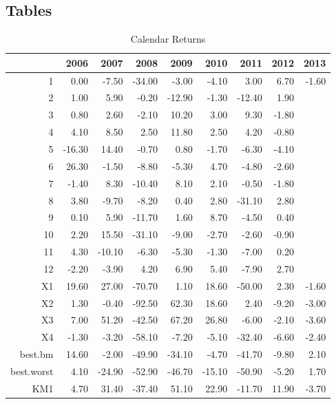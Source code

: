 \documentclass{article}
\begin{document}
\subsection{Tables}
\begin{table}[ht]
\begin{center}
\caption{Calendar Returns}
\begin{tabular}{rrrrrrrrr}
  \hline
 & 2006 & 2007 & 2008 & 2009 & 2010 & 2011 & 2012 & 2013 \\ 
  \hline
1 & 0.00 & -7.50 & -34.00 & -3.00 & -4.10 & 3.00 & 6.70 & -1.60 \\ 
  2 & 1.00 & 5.90 & -0.20 & -12.90 & -1.30 & -12.40 & 1.90 &  \\ 
  3 & 0.80 & 2.60 & -2.10 & 10.20 & 3.00 & 9.30 & -1.80 &  \\ 
  4 & 4.10 & 8.50 & 2.50 & 11.80 & 2.50 & 4.20 & -0.80 &  \\ 
  5 & -16.30 & 14.40 & -0.70 & 0.80 & -1.70 & -6.30 & -4.10 &  \\ 
  6 & 26.30 & -1.50 & -8.80 & -5.30 & 4.70 & -4.80 & -2.60 &  \\ 
  7 & -1.40 & 8.30 & -10.40 & 8.10 & 2.10 & -0.50 & -1.80 &  \\ 
  8 & 3.80 & -9.70 & -8.20 & 0.40 & 2.80 & -31.10 & 2.80 &  \\ 
  9 & 0.10 & 5.90 & -11.70 & 1.60 & 8.70 & -4.50 & 0.40 &  \\ 
  10 & 2.20 & 15.50 & -31.10 & -9.00 & -2.70 & -2.60 & -0.90 &  \\ 
  11 & 4.30 & -10.10 & -6.30 & -5.30 & -1.30 & -7.00 & 0.20 &  \\ 
  12 & -2.20 & -3.90 & 4.20 & 6.90 & 5.40 & -7.90 & 2.70 &  \\ 
  X1 & 19.60 & 27.00 & -70.70 & 1.10 & 18.60 & -50.00 & 2.30 & -1.60 \\ 
  X2 & 1.30 & -0.40 & -92.50 & 62.30 & 18.60 & 2.40 & -9.20 & -3.00 \\ 
  X3 & 7.00 & 51.20 & -42.50 & 67.20 & 26.80 & -6.00 & -2.10 & -3.60 \\ 
  X4 & -1.30 & -3.20 & -58.10 & -7.20 & -5.10 & -32.40 & -6.60 & -2.40 \\ 
  best.bm & 14.60 & -2.00 & -49.90 & -34.10 & -4.70 & -41.70 & -9.80 & 2.10 \\ 
  best.worst & 4.10 & -24.90 & -52.90 & -46.70 & -15.10 & -50.90 & -5.20 & 1.70 \\ 
  KM1 & 4.70 & 31.40 & -37.40 & 51.10 & 22.90 & -11.70 & 11.90 & -3.70 \\ 
   \hline
\end{tabular}
\end{center}
\end{table}%
\end{document}
